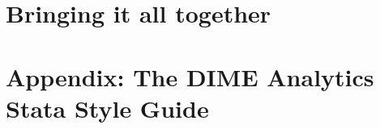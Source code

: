 


\chapter{Bringing it all together}




\chapter{Appendix: The DIME Analytics Stata Style Guide}
\label{ap:1}





\backmatter




\printindex %


